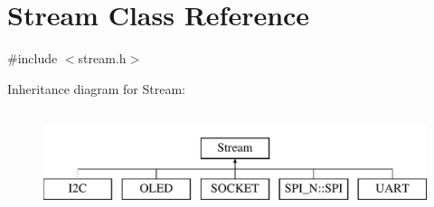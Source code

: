\hypertarget{class_stream}{}\section{Stream Class Reference}
\label{class_stream}


{\ttfamily \#include $<$stream.\+h$>$}

Inheritance diagram for Stream\+:\begin{figure}[H]
\begin{center}
\leavevmode
\includegraphics[height=3.000000cm]{class_stream}
\end{center}
\end{figure}
